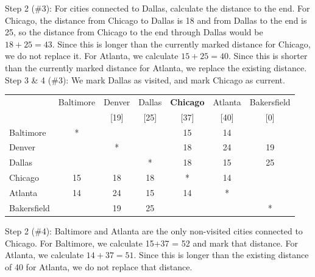 \begin{example}{}
\noindent Step 2 (\#3):  For cities connected to Dallas, calculate the distance to the end.  For Chicago, the distance from Chicago to Dallas is 18 and from Dallas to the end is 25, so the distance from Chicago to the end through Dallas would be $18+25 = 43$.  Since this is longer than the currently marked distance for Chicago, we do not replace it.  For Atlanta, we calculate $15+25 = 40$.  Since this is shorter than the currently marked distance for Atlanta, we replace the existing distance.\\

\noindent Step 3 \& 4 (\#3):  We mark Dallas as visited, and mark Chicago as current.

 \begin{center}
 \begin{tabular}{|l|c|c|c|c|c|c|}
 \hline
 & Baltimore & \cellcolor{yellow}Denver &  \cellcolor{yellow}Dallas & \textbf{Chicago} & Atlanta & \cellcolor{yellow}Bakersfield\\
 && \cellcolor{yellow}[19]& \cellcolor{yellow}[25]&[37]&[40]&\cellcolor{yellow}[0]\\
 \hline
 Baltimore & * & \cellcolor{yellow}& \cellcolor{yellow}&15&14&\cellcolor{yellow}\\
 \hline
 \cellcolor{yellow} Denver & \cellcolor{yellow}& \cellcolor{yellow}*& \cellcolor{yellow}& \cellcolor{yellow}18& \cellcolor{yellow}24&\cellcolor{yellow}19\\
 \hline
 \cellcolor{yellow}Dallas& \cellcolor{yellow}& \cellcolor{yellow}& \cellcolor{yellow}*& \cellcolor{yellow}18& \cellcolor{yellow}15&\cellcolor{yellow}25\\
 \hline
 Chicago &15& \cellcolor{yellow}18& \cellcolor{yellow}18&*&14&\cellcolor{yellow}\\
 \hline
 Atlanta & 14 &  \cellcolor{yellow}24& \cellcolor{yellow}15&14&*&\cellcolor{yellow}\\
 \hline
 \cellcolor{yellow}Bakersfield &\cellcolor{yellow}&\cellcolor{yellow}19&\cellcolor{yellow}25&\cellcolor{yellow}&\cellcolor{yellow}&\cellcolor{yellow}*\\
 \hline
 \end{tabular}
 \end{center}

\noindent Step 2 (\#4):  Baltimore and Atlanta are the only non-visited cities connected to Chicago.  For Baltimore, we calculate 15+37 = 52 and mark that distance.  For Atlanta, we calculate $14+37 = 51$.  Since this is longer than the existing distance of 40 for Atlanta, we do not replace that distance.\\


\end{example}
